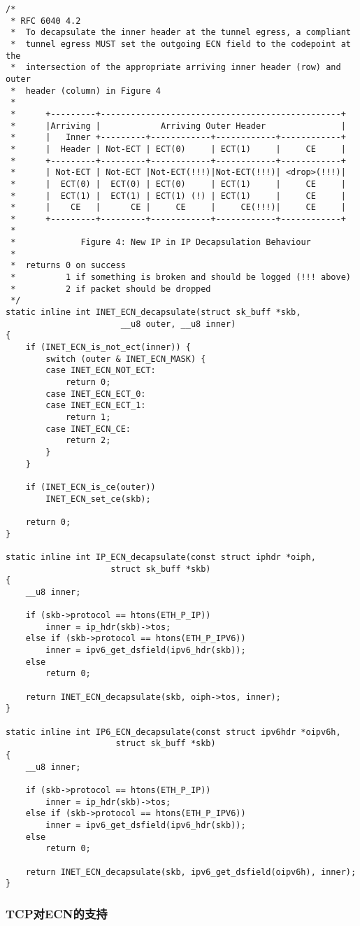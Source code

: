 \begin{verbatim}
/*
 * RFC 6040 4.2
 *  To decapsulate the inner header at the tunnel egress, a compliant
 *  tunnel egress MUST set the outgoing ECN field to the codepoint at the
 *  intersection of the appropriate arriving inner header (row) and outer
 *  header (column) in Figure 4
 *
 *      +---------+------------------------------------------------+
 *      |Arriving |            Arriving Outer Header               |
 *      |   Inner +---------+------------+------------+------------+
 *      |  Header | Not-ECT | ECT(0)     | ECT(1)     |     CE     |
 *      +---------+---------+------------+------------+------------+
 *      | Not-ECT | Not-ECT |Not-ECT(!!!)|Not-ECT(!!!)| <drop>(!!!)|
 *      |  ECT(0) |  ECT(0) | ECT(0)     | ECT(1)     |     CE     |
 *      |  ECT(1) |  ECT(1) | ECT(1) (!) | ECT(1)     |     CE     |
 *      |    CE   |      CE |     CE     |     CE(!!!)|     CE     |
 *      +---------+---------+------------+------------+------------+
 *
 *             Figure 4: New IP in IP Decapsulation Behaviour
 *
 *  returns 0 on success
 *          1 if something is broken and should be logged (!!! above)
 *          2 if packet should be dropped
 */
static inline int INET_ECN_decapsulate(struct sk_buff *skb,
				       __u8 outer, __u8 inner)
{
	if (INET_ECN_is_not_ect(inner)) {
		switch (outer & INET_ECN_MASK) {
		case INET_ECN_NOT_ECT:
			return 0;
		case INET_ECN_ECT_0:
		case INET_ECN_ECT_1:
			return 1;
		case INET_ECN_CE:
			return 2;
		}
	}

	if (INET_ECN_is_ce(outer))
		INET_ECN_set_ce(skb);

	return 0;
}

static inline int IP_ECN_decapsulate(const struct iphdr *oiph,
				     struct sk_buff *skb)
{
	__u8 inner;

	if (skb->protocol == htons(ETH_P_IP))
		inner = ip_hdr(skb)->tos;
	else if (skb->protocol == htons(ETH_P_IPV6))
		inner = ipv6_get_dsfield(ipv6_hdr(skb));
	else
		return 0;

	return INET_ECN_decapsulate(skb, oiph->tos, inner);
}

static inline int IP6_ECN_decapsulate(const struct ipv6hdr *oipv6h,
				      struct sk_buff *skb)
{
	__u8 inner;

	if (skb->protocol == htons(ETH_P_IP))
		inner = ip_hdr(skb)->tos;
	else if (skb->protocol == htons(ETH_P_IPV6))
		inner = ipv6_get_dsfield(ipv6_hdr(skb));
	else
		return 0;

	return INET_ECN_decapsulate(skb, ipv6_get_dsfield(oipv6h), inner);
}
\end{verbatim}
		
		\subsubsection{TCP对ECN的支持}




